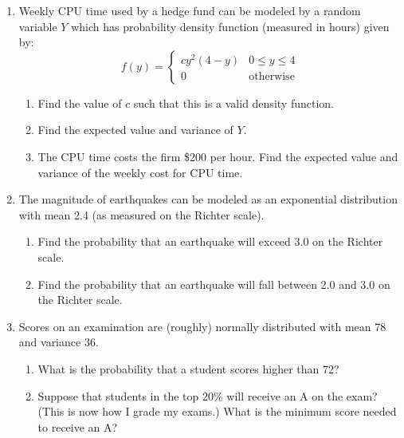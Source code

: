 \documentclass[12pt]{article}
\begin{document}
\begin{enumerate}
\item Weekly CPU time used by a hedge fund can be modeled by a random variable $Y$ which has probability density function (measured in hours) given by:
\[
f(y) = \begin{cases}
c y^2(4-y) & 0 \leq y \leq 4 \\
0 & \text{otherwise}
\end{cases}
\]
\begin{enumerate}
\item Find the value of $c$ such that this is a valid density function.
\item Find the expected value and variance of $Y$.
\item The CPU time costs the firm \$200 per hour. Find the expected value and variance of the weekly cost for CPU time.
\end{enumerate}

\item The magnitude of earthquakes can be modeled as an exponential distribution with mean 2.4 (as measured on the Richter scale). 
\begin{enumerate}
\item Find the probability that an earthquake will exceed 3.0 on the Richter scale.
\item Find the probability that an earthquake will fall between 2.0 and 3.0 on the Richter scale.
\end{enumerate}

\item Scores on an examination are (roughly) normally distributed with mean 78 and variance 36.
\begin{enumerate}
\item What is the probability that a student scores higher than 72?
\item Suppose that students in the top 20\% will receive an A on the exam? (This is now how I grade my exams.) What is the minimum score needed to receive an A?
\end{enumerate}

\end{enumerate}
\end{document}
